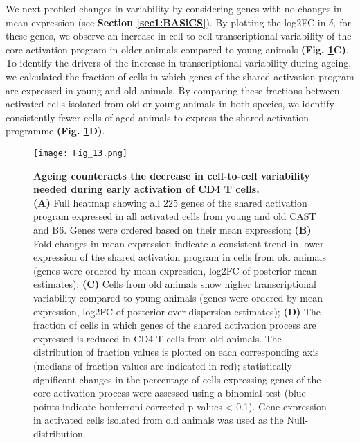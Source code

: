 We next profiled changes in variability by considering genes with no changes in mean expression (see \textbf{Section \ref{sec1:BASiCS}}). By plotting the log2FC in $\delta_i$ for these genes, we observe an increase in cell-to-cell transcriptional variability of the core activation program in older animals compared to young animals \textbf{(Fig. \ref{fig1:variability_ageing}C)}. To identify the drivers of the increase in transcriptional variability during ageing, we calculated the fraction of cells in which genes of the shared activation program are expressed in young and old animals. By comparing these fractions between activated cells isolated from old or young animals in both species, we identify consistently fewer cells of aged animals to express the shared activation programme \textbf{(Fig. \ref{fig1:variability_ageing}D)}. \\

\newpage

\begin{figure}[!ht]
\centering
\texttt{[image: Fig\_13.png]}
\caption[Ageing destabilizes the CD4\plus{} T cell response]{\textbf{Ageing counteracts the decrease in cell-to-cell variability needed during early activation of CD4\plus{} T cells.} \\
\textbf{(A)} Full heatmap showing all 225 genes of the shared activation program expressed in all activated cells from young and old CAST and B6. Genes were ordered based on their mean expression; \textbf{(B)} Fold changes in mean expression indicate a consistent trend in lower expression of the shared activation program in cells from old animals (genes were ordered by mean expression, log2FC of posterior mean estimates); \textbf{(C)} Cells from old animals show higher transcriptional variability compared to young animals (genes were ordered by mean expression, log2FC of posterior over-dispersion estimates); \textbf{(D)} The fraction of cells in which genes of the shared activation process are expressed is reduced in CD4\plus{} T cells from old animals. The distribution of fraction values is plotted on each corresponding axis (medians of fraction values are indicated in red); statistically significant changes in the percentage of cells expressing genes of the core activation process were assessed using a binomial test (blue points indicate bonferroni corrected p-values < 0.1). Gene expression in activated cells isolated from old animals was used as the Null-distribution.}
\label{fig1:variability_ageing}
\end{figure}

